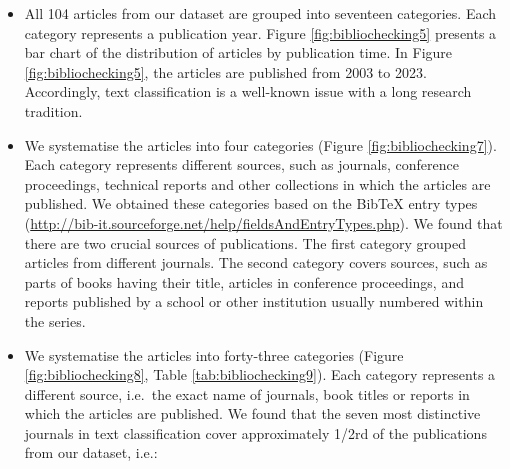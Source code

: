 \documentclass[
]{article}
\begin{document}
\begin{itemize}
\item
  All 104 articles from our dataset are grouped into seventeen categories. Each category represents a publication year. Figure \ref{fig:bibliochecking5} presents a bar chart of the distribution of articles by publication time. In Figure \ref{fig:bibliochecking5}, the articles are published from 2003 to 2023. Accordingly, text classification is a well-known issue with a long research tradition.
\item
  We systematise the articles into four categories (Figure \ref{fig:bibliochecking7}). Each category represents different sources, such as journals, conference proceedings, technical reports and other collections in which the articles are published. We obtained these categories based on the BibTeX entry types (\url{http://bib-it.sourceforge.net/help/fieldsAndEntryTypes.php}). We found that there are two crucial sources of publications. The first category grouped articles from different journals. The second category covers sources, such as parts of books having their title, articles in conference proceedings, and reports published by a school or other institution usually numbered within the series.
\item
  We systematise the articles into forty-three categories (Figure \ref{fig:bibliochecking8}, Table \ref{tab:bibliochecking9}). Each category represents a different source, i.e.~the exact name of journals, book titles or reports in which the articles are published. We found that the seven most distinctive journals in text classification cover approximately 1/2rd of the publications from our dataset, i.e.:


\end{itemize}
\end{document}
